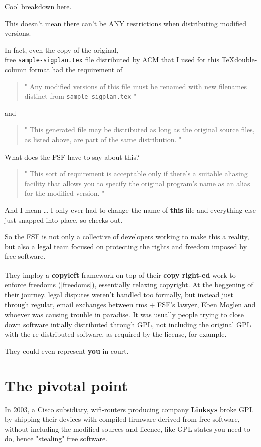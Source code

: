 \documentclass[sigplan,screen]{acmart}
\begin{document}
\href{https://www.gnu.org/philosophy/categories.html}{Cool breakdown here}. \cite{free-categories}

This doesn't mean there can't be ANY restrictions when distributing modified versions.

In fact, even the copy of the original, \\
free \verb|sample-sigplan.tex| file distributed by ACM that I used for this \TeX   double-column format had the requirement of

\begin{quote}
	"
	Any modified versions of this file must be renamed
 with new filenames distinct from \verb|sample-sigplan.tex|
	"
\end{quote}
and
\begin{quote}
	"
	This generated file may be distributed as long as the
 original source files, as listed above, are part of the
 same distribution.
	"
\end{quote}
What does the FSF have to say about this?
\begin{quote}
	"
	This sort of requirement is acceptable only if there's a suitable aliasing facility that allows you to specify the original program's name as an alias for the modified version.
	"
\end{quote}
And I mean … I only ever had to change the name of \textbf{this} file and everything else just snapped into place, so checks out.

So the FSF is not only a collective of developers working to make this a reality, but also a legal team focused on protecting the rights and freedom imposed by free software.

They imploy a \textbf{copyleft}\textsuperscript{\textcopyleft} framework on top of their \textbf{copy right-ed}\textsuperscript{\textcopyright} work to enforce freedoms (\ref{freedoms}), essentially relaxing copyright. At the beggening of their journey, legal disputes weren't handled too formally, but instead just through regular, email exchanges between rms + FSF's lawyer, Eben Moglen and whoever was causing trouble in paradise. It was usually people trying to close down software intially distributed through GPL, not including the original GPL with the re-distributed software, as required by the license, for example.

They could even represent \textbf{you} in court. \cite{about-gnu}

\section{The pivotal point}
In 2003, a Cisco subsidiary, wifi-routers producing company \textbf{Linksys} broke GPL by shipping their devices with compiled firmware derived from free software, without including the modified sources and licence, like GPL states you need to do, hence "stealing" free software. \cite{fsf-vs-cisco}
\end{document}
